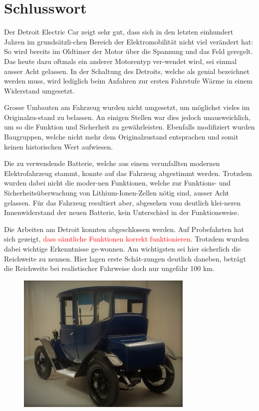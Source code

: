 \chapter{Schlusswort}
\color{blue}
Der Detroit Electric Car zeigt sehr gut, dass sich in den letzten einhundert Jahren im grundsätzli-chen Bereich der Elektromobilität nicht viel verändert hat: So wird bereits im Oldtimer der Motor über die Spannung und das Feld geregelt. Das heute dazu oftmals ein anderer Motorentyp ver-wendet wird, sei einmal ausser Acht gelassen. In der Schaltung des Detroits, welche als genial bezeichnet werden muss, wird lediglich beim Anfahren zur ersten Fahrstufe Wärme in einem Widerstand umgesetzt.

Grosse Umbauten am Fahrzeug wurden nicht umgesetzt, um möglichst vieles im Originalzu-stand zu belassen. An einigen Stellen war dies jedoch unausweichlich, um so die Funktion und Sicherheit zu gewährleisten. Ebenfalls modifiziert wurden Baugruppen, welche nicht mehr dem Originalzustand entsprachen und somit keinen historischen Wert aufwiesen.

Die zu verwendende Batterie, welche aus einem verunfallten modernen Elektrofahrzeug stammt, konnte auf das Fahrzeug abgestimmt werden. Trotzdem wurden dabei nicht die moder-nen Funktionen, welche zur Funktions- und Sicherheitsüberwachung von Lithium-Ionen-Zellen nötig sind, ausser Acht gelassen. Für das Fahrzeug resultiert aber, abgesehen vom deutlich klei-neren Innenwiderstand der neuen Batterie, kein Unterschied in der Funktionsweise.

Die Arbeiten am Detroit konnten abgeschlossen werden. Auf Probefahrten hat sich gezeigt, \textcolor{red}{dass sämtliche Funktionen korrekt funktionieren}. Trotzdem wurden dabei wichtige Erkenntnisse ge-wonnen. Am wichtigsten sei hier sicherlich die Reichweite zu nennen. Hier lagen erste Schät-zungen deutlich daneben, beträgt die Reichweite bei realistischer Fahrweise doch nur ungefähr 100 km.

\begin{figure}[h]
	\centering
		\includegraphics[width=0.75\textwidth]{images/Ende.jpg}
	\label{fig:Ende}
\end{figure}


\color{black}